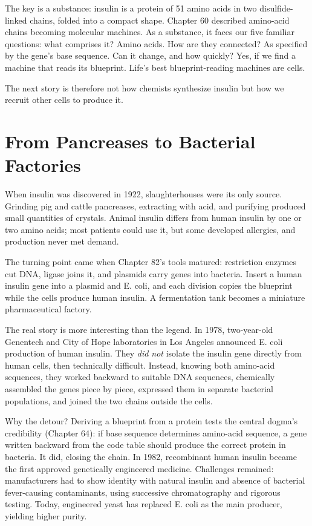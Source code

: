 The key is a substance: insulin is a protein of 51 amino acids in two disulfide-linked chains, folded into a compact shape. Chapter 60 described amino-acid chains becoming molecular machines. As a substance, it faces our five familiar questions: what comprises it? Amino acids. How are they connected? As specified by the gene's base sequence. Can it change, and how quickly? Yes, if we find a machine that reads its blueprint. Life's best blueprint-reading machines are cells.

The next story is therefore not how chemists synthesize insulin but how we recruit other cells to produce it.

\section{From Pancreases to Bacterial Factories}

When insulin was discovered in 1922, slaughterhouses were its only source. Grinding pig and cattle pancreases, extracting with acid, and purifying produced small quantities of crystals. Animal insulin differs from human insulin by one or two amino acids; most patients could use it, but some developed allergies, and production never met demand.

The turning point came when Chapter 82's tools matured: restriction enzymes cut DNA, ligase joins it, and plasmids carry genes into bacteria. Insert a human insulin gene into a plasmid and E. coli, and each division copies the blueprint while the cells produce human insulin. A fermentation tank becomes a miniature pharmaceutical factory.

\begin{zhengju}
The real story is more interesting than the legend. In 1978, two-year-old Genentech and City of Hope laboratories in Los Angeles announced E. coli production of human insulin. They \emph{did not} isolate the insulin gene directly from human cells, then technically difficult. Instead, knowing both amino-acid sequences, they worked backward to suitable DNA sequences, chemically assembled the genes piece by piece, expressed them in separate bacterial populations, and joined the two chains outside the cells.

Why the detour? Deriving a blueprint from a protein tests the central dogma's credibility (Chapter 64): if base sequence determines amino-acid sequence, a gene written backward from the code table should produce the correct protein in bacteria. It did, closing the chain. In 1982, recombinant human insulin became the first approved genetically engineered medicine. Challenges remained: manufacturers had to show identity with natural insulin and absence of bacterial fever-causing contaminants, using successive chromatography and rigorous testing. Today, engineered yeast has replaced E. coli as the main producer, yielding higher purity.
\end{zhengju}

